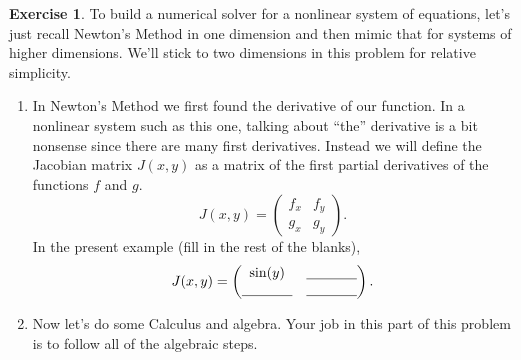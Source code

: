 \documentclass[
]{book}
\theoremstyle{definition}
\theoremstyle{definition}
\theoremstyle{definition}
\newtheorem{exercise}{Exercise}[chapter]
\theoremstyle{remark}
\begin{document}
\begin{exercise}
\protect\hypertarget{exr:unnamed-chunk-854}{}{\label{exr:unnamed-chunk-854} }To build a numerical solver for a nonlinear system of equations, let's just recall Newton's Method in one dimension and then mimic that for systems of higher dimensions. We'll stick to two dimensions in this problem for relative simplicity.

\begin{enumerate}
\def\labelenumi{\alph{enumi}.}
\item
  In Newton's Method we first found the derivative of our function. In
  a nonlinear system such as this one, talking about ``the'' derivative
  is a bit nonsense since there are many first derivatives. Instead we
  will define the Jacobian matrix \(J(x,y)\) as a matrix of the first
  partial derivatives of the functions \(f\) and \(g\).
  \[J(x,y) = \begin{pmatrix} f_x & f_y \\ g_x & g_y \end{pmatrix}.\]
  In the present example (fill in the rest of the blanks),
  \[J(x,y) = \begin{pmatrix} \sin(y) &
                  \underline{\hspace{0.5in}} \\  \underline{\hspace{0.5in}} &
              \underline{\hspace{0.5in}} \end{pmatrix}.\]
\item
  Now let's do some Calculus and algebra. Your job in this part of
  this problem is to follow all of the algebraic steps.


\end{enumerate}
\end{exercise}
\end{document}
